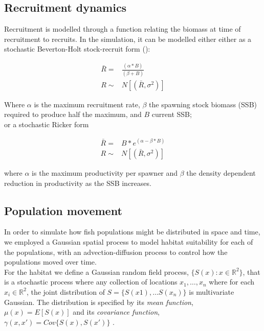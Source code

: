 \documentclass[review]{elsarticle}
\begin{document}
\subsection{Recruitment dynamics}

Recruitment is modelled through a function relating the biomass at time of
recruitment to recruits. In the simulation, it can be modelled either either as
a stochastic Beverton-Holt stock-recruit form (\cite{Beverton1957}): 

\begin{equation*}
	\begin{split}
	\bar{R} = & \frac{(\alpha * B)}{(\beta + B)} \\
	     R \sim & N[(\bar{R},\sigma^2)]
	\end{split}
\end{equation*}

Where $\alpha$ is the maximum recruitment rate, $\beta$ the spawning stock
biomass (SSB) required to produce half the maximum, and $B$ current SSB; \\

or a stochastic Ricker form \cite{Ricker1954}

\begin{equation*}
	\begin{split}
	\bar{R} = & B * e^{(\alpha - \beta * B)} \\	
   	     R \sim & N[(\bar{R},\sigma^2)]
	\end{split}
\end{equation*}

where $\alpha$ is the maximum productivity per spawner and $\beta$ the density
dependent reduction in productivity as the SSB increases.

\subsection{Population movement}

In order to simulate how fish populations might be distributed in space and
time, we employed a Gaussian spatial process to model habitat suitability for
each of the populations, with an advection-diffusion process to control how the
populations moved over time. \\

For the habitat we define a Gaussian random field process, $\{S(x) : x \in
\mathbb{R}^2\}$, that is a stochastic process where any collection of locations
$x_{1}, \dots, x_{n}$ where for each $x_{i} \in \mathbb{R}^2$, the joint
distribution of $S = \{S(x1),\dots S(x_{n})\}$ is multivariate Gaussian. The
distribution is specified by its \textit{mean function}, $\mu(x) = E[S(x)]$ and
its \textit{covariance function}, $\gamma(x,x') = Cov\{S(x),S(x')\}$
\cite{Diggle2007}.\\
\end{document}
